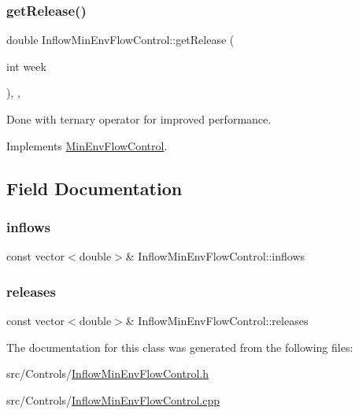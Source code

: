 \subsubsection{\texorpdfstring{get\+Release()}{getRelease()}}
{\footnotesize\ttfamily double Inflow\+Min\+Env\+Flow\+Control\+::get\+Release (\begin{DoxyParamCaption}\item[{int}]{week }\end{DoxyParamCaption})\hspace{0.3cm}{\ttfamily [override]}, {\ttfamily [private]}, {\ttfamily [virtual]}}

Done with ternary operator for improved performance. 

Implements \mbox{\hyperlink{classMinEnvFlowControl_a5de79615852eb0c937dd559a9eb9402d_a5de79615852eb0c937dd559a9eb9402d}{Min\+Env\+Flow\+Control}}.



\subsection{Field Documentation}
\mbox{\label{classInflowMinEnvFlowControl_a669660259afa9313c77094dec815a52f_a669660259afa9313c77094dec815a52f}} 
\subsubsection{\texorpdfstring{inflows}{inflows}}
{\footnotesize\ttfamily const vector$<$double$>$\& Inflow\+Min\+Env\+Flow\+Control\+::inflows}

\mbox{\label{classInflowMinEnvFlowControl_a2f82b53516516be63eb169d377df1f55_a2f82b53516516be63eb169d377df1f55}} 
\subsubsection{\texorpdfstring{releases}{releases}}
{\footnotesize\ttfamily const vector$<$double$>$\& Inflow\+Min\+Env\+Flow\+Control\+::releases}



The documentation for this class was generated from the following files\+:\begin{DoxyCompactItemize}
\item 
src/\+Controls/\mbox{\hyperlink{InflowMinEnvFlowControl_8h}{Inflow\+Min\+Env\+Flow\+Control.\+h}}\item 
src/\+Controls/\mbox{\hyperlink{InflowMinEnvFlowControl_8cpp}{Inflow\+Min\+Env\+Flow\+Control.\+cpp}}\end{DoxyCompactItemize}

